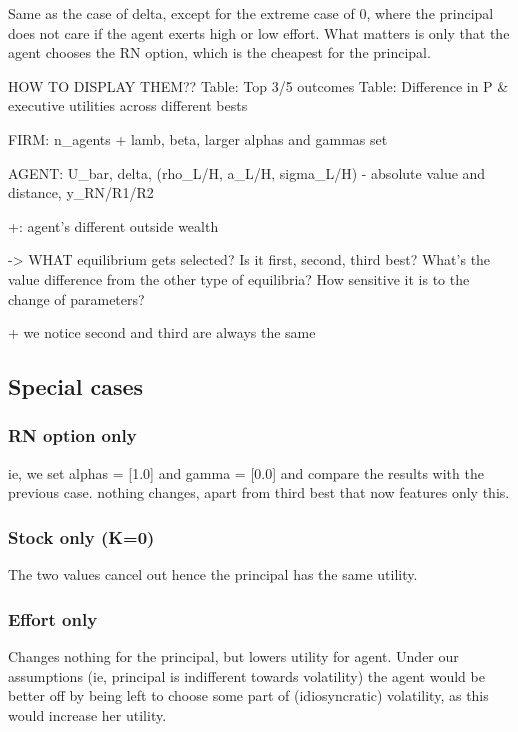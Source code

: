 Same as the case of delta, except for the extreme case of 0, where the principal does not care if the agent exerts high or low effort. What matters is only that the agent chooses the RN option, which is the cheapest for the principal.


HOW TO DISPLAY THEM??
    Table: Top 3/5 outcomes
    Table: Difference in P \& executive utilities across different bests

    FIRM: n\_agents + lamb, beta, larger alphas and gammas set

    AGENT: U\_bar, delta, (rho\_L/H, a\_L/H, sigma\_L/H) - absolute value and distance, y\_RN/R1/R2

    +: agent's different outside wealth

    -> WHAT equilibrium gets selected? Is it first, second, third best? What's the value difference from the other type of equilibria? How sensitive it is to the change of parameters?
    
+ we notice second and third are always the same






\subsection*{Special cases}
\subsubsection*{RN option only}
ie, we set alphas = [1.0] and gamma = [0.0] and compare the results with the previous case.
nothing changes, apart from third best that now features only this.

\subsubsection*{Stock only (K=0)}
The two values cancel out hence the principal has the same utility.

\subsubsection*{Effort only}
Changes nothing for the principal, but lowers utility for agent. Under our assumptions (ie, principal is indifferent towards volatility) the agent would be better off by being left to choose some part of (idiosyncratic) volatility, as this would increase her utility.

